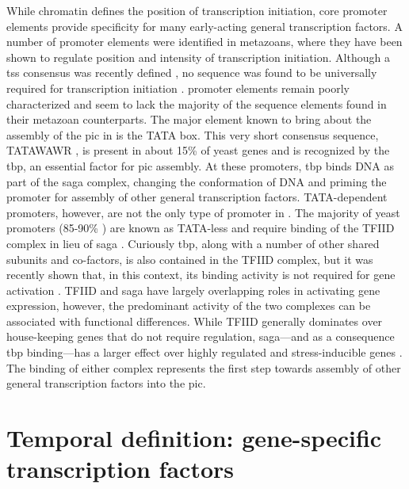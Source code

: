 While chromatin defines the position of transcription initiation, core promoter elements provide specificity for many early-acting general transcription factors. 
A number of promoter elements were identified in metazoans, where they have been shown to regulate position and intensity of transcription initiation.
Although a \gls{tss} consensus was recently defined \cite{malabat:2015:quality}, no sequence was found to be universally required for transcription initiation \cite{butler:2002:RNA}.
\cer{} promoter elements remain poorly characterized and seem to lack the majority of the sequence elements found in their metazoan counterparts. 
The major element known to bring about the assembly of the \gls{pic} in \cer{} is the TATA box.
This very short consensus sequence, TATAWAWR \citep{basehoar:2004:identification}, is present in about 15\% of yeast genes \cite{kamenova:2014:mutations} and is recognized by the \gls{tbp}, an essential factor for \gls{pic} assembly. 
At these promoters, \gls{tbp} binds DNA as part of the \gls{saga} complex, changing the conformation of DNA and priming the promoter for assembly of other general transcription factors. 
TATA-dependent promoters, however, are not the only type of promoter in \cer{}. 
The majority of yeast promoters (85-90\% )  are known as TATA-less and require binding of the TFIID complex in lieu of \gls{saga} \citep{rhee:2012:genomewide}. 
Curiously \gls{tbp}, along with a number of other shared subunits and co-factors, is also contained in the TFIID complex, but it was recently shown that, in this context, its binding activity is not required for gene activation \cite{kamenova:2014:mutations}.
TFIID and \gls{saga} have largely overlapping roles in activating gene expression, however, the predominant activity of the two complexes can be associated with functional differences.
While TFIID generally dominates over house-keeping genes that do not require regulation, \gls{saga}---and as a consequence \gls{tbp} binding---has a larger effect over highly regulated and stress-inducible genes \citep{huisinga:2004:genomewide}.
The binding of either complex represents the first step towards assembly of other general transcription factors into the \gls{pic}.

\singlespacing
\section{Temporal definition: gene-specific transcription factors}
\doublespacing


